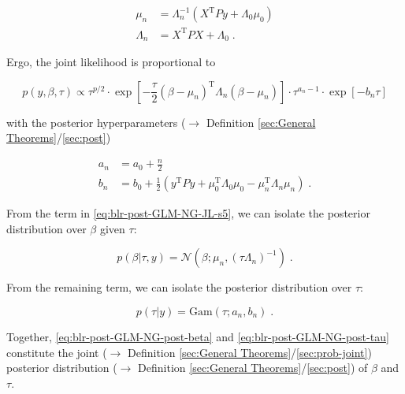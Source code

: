 \documentclass[a4paper,12pt,twoside]{book}
\begin{document}
\begin{equation} \label{eq:blr-post-GLM-NG-post-beta-par}
\begin{split}
\mu_n &= \Lambda_n^{-1} (X^\mathrm{T} P y + \Lambda_0 \mu_0) \\
\Lambda_n &= X^\mathrm{T} P X + \Lambda_0 \; .
\end{split}
\end{equation}

Ergo, the joint likelihood is proportional to

\begin{equation} \label{eq:blr-post-GLM-NG-JL-s5}
p(y,\beta,\tau) \propto \tau^{p/2} \cdot \exp\left[ -\frac{\tau}{2} (\beta-\mu_n)^\mathrm{T} \Lambda_n (\beta-\mu_n) \right] \cdot \tau^{a_n-1} \cdot \exp\left[ -b_n \tau \right]
\end{equation}

with the posterior hyperparameters ($\rightarrow$ Definition \ref{sec:General Theorems}/\ref{sec:post})

\begin{equation} \label{eq:blr-post-GLM-NG-post-tau-par}
\begin{split}
a_n &= a_0 + \frac{n}{2} \\
b_n &= b_0 + \frac{1}{2} (y^\mathrm{T} P y + \mu_0^\mathrm{T} \Lambda_0 \mu_0 - \mu_n^\mathrm{T} \Lambda_n \mu_n) \; .
\end{split}
\end{equation}

From the term in \eqref{eq:blr-post-GLM-NG-JL-s5}, we can isolate the posterior distribution over $\beta$ given $\tau$:

\begin{equation} \label{eq:blr-post-GLM-NG-post-beta}
p(\beta|\tau,y) = \mathcal{N}(\beta; \mu_n, (\tau \Lambda_n)^{-1}) \; .
\end{equation}

From the remaining term, we can isolate the posterior distribution over $\tau$:

\begin{equation} \label{eq:blr-post-GLM-NG-post-tau}
p(\tau|y) = \mathrm{Gam}(\tau; a_n, b_n) \; .
\end{equation}

Together, \eqref{eq:blr-post-GLM-NG-post-beta} and \eqref{eq:blr-post-GLM-NG-post-tau} constitute the joint ($\rightarrow$ Definition \ref{sec:General Theorems}/\ref{sec:prob-joint}) posterior distribution ($\rightarrow$ Definition \ref{sec:General Theorems}/\ref{sec:post}) of $\beta$ and $\tau$.
\end{document}
